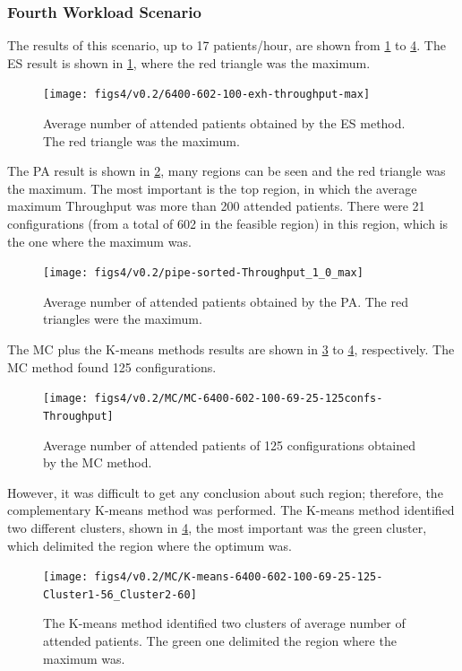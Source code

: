\subsubsection{Fourth Workload Scenario}

The results of this scenario, up to 17 patients/hour, are shown from
\ref{subfig:es16-2} to \ref{subfig:km16-2}. The ES result is shown
in \ref{subfig:es16-2}, where the red triangle was the maximum. 
\begin{figure}[H]
\centering{}\texttt{[image: figs4/v0.2/6400-602-100-exh-throughput-max]}\caption{Average number of attended patients obtained by the ES method. The
red triangle was the maximum.\label{subfig:es16-2}}
\end{figure}


The PA result is shown in \ref{subfig:pipe16-2}, many regions can
be seen and the red triangle was the maximum. The most important is
the top region, in which the average maximum Throughput was more than
200 attended patients. There were 21 configurations (from a total
of 602 in the feasible region) in this region, which is the one where
the maximum was.
\begin{figure}[H]
\centering{}\texttt{[image: figs4/v0.2/pipe-sorted-Throughput\_1\_0\_max]}\caption{Average number of attended patients obtained by the PA. The red triangles
were the maximum.\label{subfig:pipe16-2}}
\end{figure}


The MC plus the K-means methods results are shown in \ref{subfig:mc16-2}
to \ref{subfig:km16-2}, respectively. The MC method found 125 configurations.
\begin{figure}[H]
\centering{}\texttt{[image: figs4/v0.2/MC/MC-6400-602-100-69-25-125confs-Throughput]}\caption{Average number of attended patients of 125 configurations obtained
by the MC method. \label{subfig:mc16-2}}
\end{figure}
However, it was difficult to get any conclusion about such region;
therefore, the complementary K-means method was performed. The K-means
method identified two different clusters, shown in \ref{subfig:km16-2},
the most important was the green cluster, which delimited the region
where the optimum was.
\begin{figure}[H]
\begin{centering}
\texttt{[image: figs4/v0.2/MC/K-means-6400-602-100-69-25-125-Cluster1-56\_Cluster2-60]}
\par\end{centering}

\caption{The K-means method identified two clusters of average number of attended
patients. The green one delimited the region where the maximum was.\label{subfig:km16-2}}
\end{figure}


